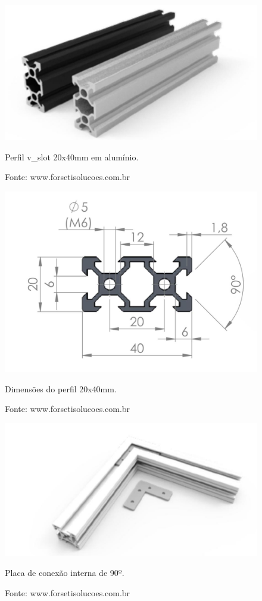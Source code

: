 \begin{figure}[!htb]
\centering
\includegraphics[scale = 1]{figuras/3-1}
\caption{Perfil v\_slot  20x40mm em alumínio.}
\caption*{Fonte: www.forsetisolucoes.com.br}
\label{figp20x40p}
\end{figure}
    
\begin{figure}[!htb]
\centering
\includegraphics[scale = 1]{figuras/3-2}
\caption{Dimensões do perfil 20x40mm.}
\caption*{Fonte: www.forsetisolucoes.com.br}
\label{figp20x40d}
\end{figure}
    
\begin{figure}[!htb]
\centering
\includegraphics[scale = 1]{figuras/3-3}
\caption{Placa de conexão interna de 90º.}
\caption*{Fonte: www.forsetisolucoes.com.br}
\label{figpconexao90p}
\end{figure}
    
